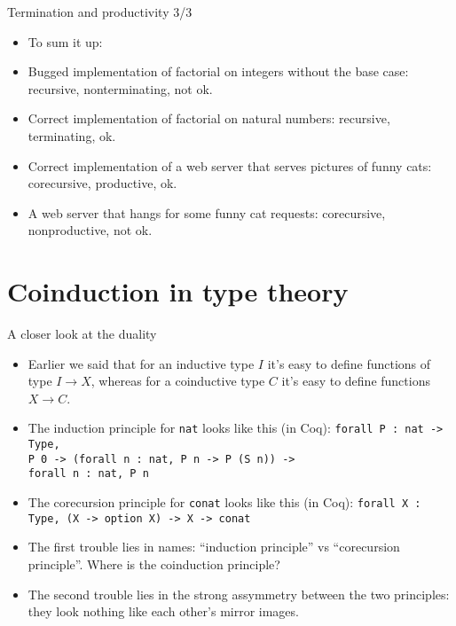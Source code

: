 \documentclass{beamer}
\begin{document}
\begin{frame}{Termination and productivity 3/3}
\begin{itemize}
	\item To sum it up:
	\item Bugged implementation of factorial on integers without the base case: recursive, nonterminating, not ok.
	\item Correct implementation of factorial on natural numbers: recursive, terminating, ok.
	\item Correct implementation of a web server that serves pictures of funny cats: corecursive, productive, ok.
	\item A web server that hangs for some funny cat requests: corecursive, nonproductive, not ok.
\end{itemize}
\end{frame}

\section{Coinduction in type theory}

\begin{frame}{A closer look at the duality}
\begin{itemize}
	\item Earlier we said that for an inductive type $I$ it's easy to define functions of type $I \to X$, whereas for a coinductive type $C$ it's easy to define functions $X \to C$.
	\item The induction principle for \texttt{nat} looks like this (in Coq): \texttt{forall P : nat -> Type, \\ P 0 -> (forall n : nat, P n -> P (S n)) -> \\ forall n : nat, P n}
	\item The corecursion principle for \texttt{conat} looks like this (in Coq): \texttt{forall X : Type, (X -> option X) -> X -> conat}
	\item The first trouble lies in names: ``induction principle'' vs ``corecursion principle''. Where is the coinduction principle?
	\item The second trouble lies in the strong assymmetry between the two principles: they look nothing like each other's mirror images.
\end{itemize}
\end{frame}
\end{document}
